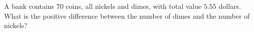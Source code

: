 A bank contains $70$ coins, all nickels and dimes, with total value $5.55$ dollars. What is the positive difference between the number of dimes and the number of nickels?
